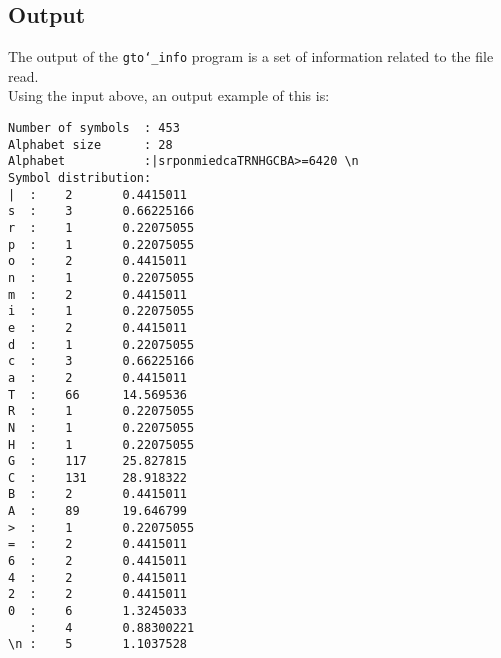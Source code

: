 \subsection*{Output}
The output of the \texttt{gto\char`_info} program is a set of information related to the file read. \\
Using the input above, an output example of this is:
\begin{lstlisting}
Number of symbols  : 453
Alphabet size      : 28
Alphabet           :|srponmiedcaTRNHGCBA>=6420 \n
Symbol distribution:
|  : 	2		0.4415011
s  : 	3		0.66225166
r  : 	1		0.22075055
p  : 	1		0.22075055
o  : 	2		0.4415011
n  : 	1		0.22075055
m  : 	2		0.4415011
i  : 	1		0.22075055
e  : 	2		0.4415011
d  : 	1		0.22075055
c  : 	3		0.66225166
a  : 	2		0.4415011
T  : 	66		14.569536
R  : 	1		0.22075055
N  : 	1		0.22075055
H  : 	1		0.22075055
G  : 	117		25.827815
C  : 	131		28.918322
B  : 	2		0.4415011
A  : 	89		19.646799
>  : 	1		0.22075055
=  : 	2		0.4415011
6  : 	2		0.4415011
4  : 	2		0.4415011
2  : 	2		0.4415011
0  : 	6		1.3245033
   : 	4		0.88300221
\n : 	5		1.1037528
\end{lstlisting}
